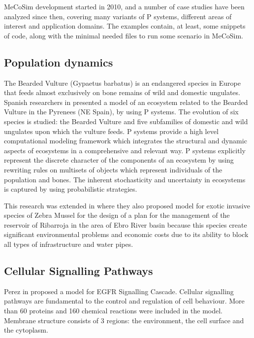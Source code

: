 MeCoSim development started in 2010, and a number of case studies have been analyzed since then, covering many variants of P systems, different areas of interest and application domains. The examples contain, at least, some snippets of code, along with the minimal needed files to run some scenario in MeCoSim.


\subsection{Population dynamics} %
\label{sub:population_dynamics}

The Bearded Vulture (Gypaetus barbatus) is an endangered species in Europe that feeds almost exclusively on bone remains of wild and domestic ungulates. Spanish researchers in \cite{Cardona:2009:Vultures} presented a model of an ecosystem related to the Bearded Vulture in the Pyrenees (NE Spain), by using P systems. The evolution of six species is studied: the Bearded Vulture and five subfamilies of domestic and wild ungulates upon which the vulture feeds. P systems provide a high level computational modeling framework which integrates the structural and dynamic aspects of ecosystems in a comprehensive and relevant way. P systems explicitly represent the discrete character of the components of an ecosystem by using rewriting rules on multisets of objects which represent individuals of the population and bones. The inherent stochasticity and uncertainty in ecosystems is captured by using probabilistic strategies.

This research was extended in \cite{Cardona11Zebra} where they also proposed model for exotic invasive species of Zebra Mussel for the design of a plan for the management of the reservoir of Ribarroja in the area of Ebro River basin because this species create significant environmental problems and economic costs due to its ability to block all types of infrastructure and water pipes.


\subsection{Cellular Signalling Pathways} %
\label{sub:cellular_signalling_pathways}

Perez in \cite{Perez06EGFR} proposed a model for EGFR Signalling Cascade. Cellular signalling pathways are fundamental to the control and regulation of cell behaviour. More than 60 proteins and 160 chemical reactions were included in the model. Membrane structure consists of 3 regions: the environment, the cell surface and the cytoplasm. 

